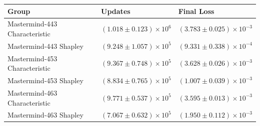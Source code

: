 \begin{tabular}{lll}
\toprule
Group & Updates & Final Loss \\
\midrule
Mastermind-443 Characteristic & $(1.018 \pm 0.123) \times 10^{6}$ & $(3.783 \pm 0.025) \times 10^{-3}$ \\
Mastermind-443 Shapley & $(9.248 \pm 1.057) \times 10^{5}$ & $(9.331 \pm 0.338) \times 10^{-4}$ \\
Mastermind-453 Characteristic & $(9.367 \pm 0.748) \times 10^{5}$ & $(3.628 \pm 0.026) \times 10^{-3}$ \\
Mastermind-453 Shapley & $(8.834 \pm 0.765) \times 10^{5}$ & $(1.007 \pm 0.039) \times 10^{-3}$ \\
Mastermind-463 Characteristic & $(9.771 \pm 0.537) \times 10^{5}$ & $(3.595 \pm 0.013) \times 10^{-3}$ \\
Mastermind-463 Shapley & $(7.067 \pm 0.632) \times 10^{5}$ & $(1.950 \pm 0.112) \times 10^{-3}$ \\
\bottomrule
\end{tabular}
